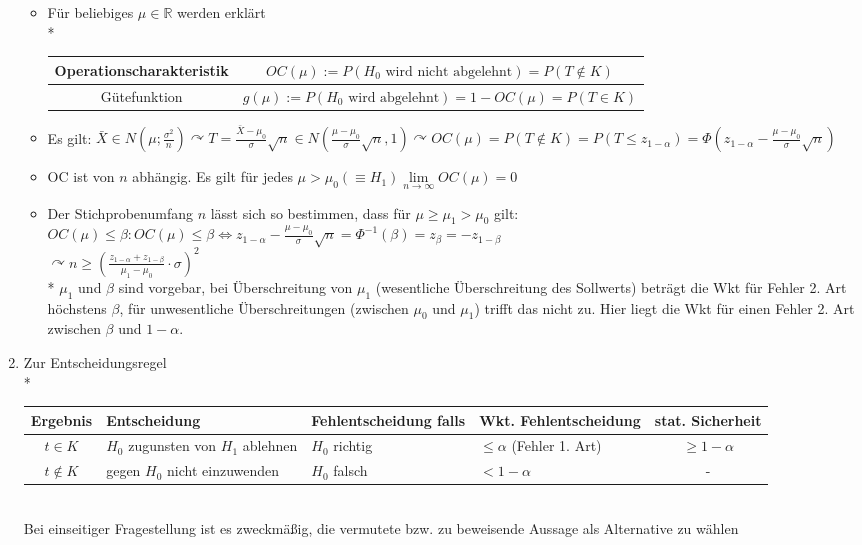 \documentclass[a4paper]{scrartcl}
\begin{document}
\begin{enumerate}
    \begin{itemize}
    \item Für beliebiges $\mu \in \mathbb{R}$ werden erklärt\\*
    \begin{tabular}{c|c} 
    Operationscharakteristik & $OC(\mu) := P(H_0 \text{ wird nicht abgelehnt}) = P(T \notin K)$\\ \hline
    Gütefunktion & $g(\mu) := P(H_0 \text{  wird abgelehnt}) = 1-OC(\mu) = P(T\in K)$\\
    \end{tabular}
    \item Es gilt: $\bar{X} \in N(\mu; \frac{\sigma^2}{n}) \curvearrowright T= \frac{\bar{X} - \mu_0}{\sigma} \sqrt{n} \in N ( \frac{\mu-\mu_0}{\sigma} \sqrt{n},1) \curvearrowright OC(\mu) = P(T \notin K) = P (T \leq z_{1-\alpha})= \Phi (z_{1-\alpha} - \frac{\mu - \mu_0}{\sigma} \sqrt{n})$
    
    \item OC ist von $n$ abhängig. Es gilt für jedes $\mu > \mu_0 (\equiv H_1) \lim\limits_{n \to \infty} OC(\mu) = 0$
    \item Der Stichprobenumfang $n$ lässt sich so bestimmen, dass für $\mu \geq \mu_1 > \mu_0$ gilt: $OC(\mu) \leq \beta : OC(\mu) \leq \beta \Leftrightarrow z_{1-\alpha} - \frac{\mu-\mu_0}{\sigma} \sqrt{n} = \Phi^{-1} (\beta) = z_\beta = -z_{1-\beta}$\\
    $\curvearrowright n \geq (\frac{z_{1-\alpha} + z_{1-\beta}}{\mu_1 - \mu_0} \cdot \sigma )^2$\\*
    $\mu_1$ und $\beta$ sind vorgebar, bei Überschreitung von $\mu_1$ (wesentliche Überschreitung des Sollwerts) beträgt die Wkt für Fehler 2. Art höchstens $\beta$, für unwesentliche Überschreitungen (zwischen $\mu_0$ und $\mu_1$) trifft das nicht zu. Hier liegt die Wkt für einen Fehler 2. Art zwischen $\beta$ und $1-\alpha$.
    \end{itemize}

\item Zur Entscheidungsregel\\*
\begin{tabular}{c|p{3cm}||p{3cm}|p{2cm}|c}
Ergebnis & Entscheidung & Fehlentscheidung falls & Wkt. Fehlentscheidung & stat. Sicherheit \\ \hline
$t \in K$ & $H_0$ zugunsten von $H_1$ ablehnen & $H_0$ richtig & $\leq \alpha$ (Fehler 1. Art) & $\geq 1 - \alpha$ \\ \hline
$t \notin K$ & gegen $H_0$ nicht einzuwenden & $H_0$ falsch & $< 1 - \alpha$ & - \\
\end{tabular}\\
Bei einseitiger Fragestellung ist es zweckmäßig, die vermutete bzw. zu beweisende Aussage als Alternative zu wählen
\end{enumerate}
\end{document}
